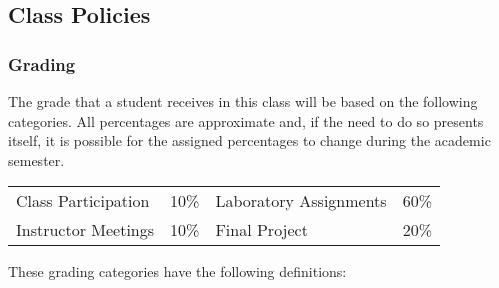 \subsection*{Class Policies}

\subsubsection*{Grading}

The grade that a student receives in this class will be based on the following categories. All percentages are
approximate and, if the need to do so presents itself, it is possible for the assigned percentages to change during the
academic semester. 

\begin{center}
\begin{tabular}{llll}
Class Participation & 10\% & Laboratory Assignments & 60\% \\
Instructor Meetings & 10\% & Final Project & 20\%
\end{tabular}
\end{center}

\vspace*{-.1in}
\noindent
These grading categories have the following definitions:
\vspace*{-.1in}


